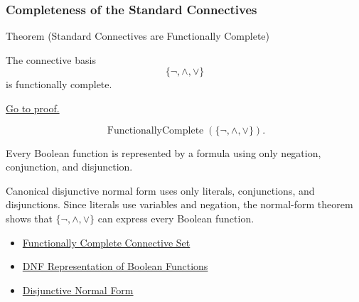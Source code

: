 \subsubsection*{Completeness of the Standard Connectives}

\begin{theorembox}{Theorem (Standard Connectives are Functionally Complete)}
\begin{theorem}
\label{thm:standard-connectives-functionally-complete-propositional-logic}
The connective basis
\[
\{\neg,\land,\lor\}
\]
is functionally complete.

\noindent\hyperref[prf:standard-connectives-functionally-complete-propositional-logic]{Go to proof.}
\end{theorem}
\end{theorembox}

\begin{remark*}
\[
\operatorname{FunctionallyComplete}(\{\neg,\land,\lor\}).
\]
\end{remark*}



\begin{remark*}[Interpretation]
Every Boolean function is represented by a formula using only negation,
conjunction, and disjunction.

Canonical disjunctive normal form uses only literals, conjunctions, and
disjunctions. Since literals use variables and negation, the normal-form theorem
shows that \(\{\neg,\land,\lor\}\) can express every Boolean function.
\end{remark*}

\begin{dependencies}
\begin{itemize}
  \item \hyperref[def:functionally-complete-connective-set-propositional-logic]{Functionally Complete Connective Set}
  \item \hyperref[thm:dnf-representation-of-boolean-functions-propositional-logic]{DNF Representation of Boolean Functions}
  \item \hyperref[def:disjunctive-normal-form-propositional-logic]{Disjunctive Normal Form}
\end{itemize}
\end{dependencies}

